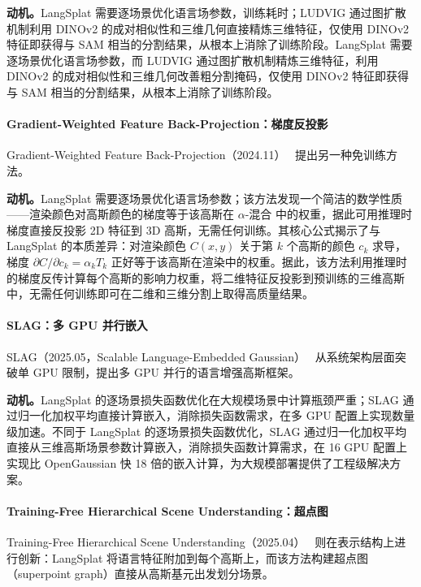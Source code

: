 \textbf{动机。}LangSplat 需要逐场景优化语言场参数，训练耗时；LUDVIG 通过图扩散机制利用 DINOv2 的成对相似性和三维几何直接精炼三维特征，仅使用 DINOv2 特征即获得与 SAM 相当的分割结果，从根本上消除了训练阶段。LangSplat 需要逐场景优化语言场参数，而 LUDVIG 通过图扩散机制精炼三维特征，利用 DINOv2 的成对相似性和三维几何改善粗分割掩码，仅使用 DINOv2 特征即获得与 SAM 相当的分割结果，从根本上消除了训练阶段。

\paragraph{Gradient-Weighted Feature Back-Projection：梯度反投影} Gradient-Weighted Feature Back-Projection（2024.11）~\cite{2411_15193} 提出另一种免训练方法。

\textbf{动机。}LangSplat 需要逐场景优化语言场参数；该方法发现一个简洁的数学性质——渲染颜色对高斯颜色的梯度等于该高斯在 $\alpha$-混合 中的权重，据此可用推理时梯度直接反投影 2D 特征到 3D 高斯，无需任何训练。其核心公式揭示了与 LangSplat 的本质差异：对渲染颜色 $C(x,y)$ 关于第 $k$ 个高斯的颜色 $c_k$ 求导，梯度 $\partial C / \partial c_k = \alpha_k T_k$ 正好等于该高斯在渲染中的权重。据此，该方法利用推理时的梯度反传计算每个高斯的影响力权重，将二维特征反投影到预训练的三维高斯中，无需任何训练即可在二维和三维分割上取得高质量结果。

\paragraph{SLAG：多 GPU 并行嵌入} SLAG（2025.05，Scalable Language-Embedded Gaussian）~\cite{2505_08124} 从系统架构层面突破单 GPU 限制，提出多 GPU 并行的语言增强高斯框架。

\textbf{动机。}LangSplat 的逐场景损失函数优化在大规模场景中计算瓶颈严重；SLAG 通过归一化加权平均直接计算嵌入，消除损失函数需求，在多 GPU 配置上实现数量级加速。不同于 LangSplat 的逐场景损失函数优化，SLAG 通过归一化加权平均直接从三维高斯场景参数计算嵌入，消除损失函数计算需求，在 16 GPU 配置上实现比 OpenGaussian 快 18 倍的嵌入计算，为大规模部署提供了工程级解决方案。

\paragraph{Training-Free Hierarchical Scene Understanding：超点图} Training-Free Hierarchical Scene Understanding（2025.04）~\cite{2504_13153} 则在表示结构上进行创新：LangSplat 将语言特征附加到每个高斯上，而该方法构建超点图（superpoint graph）直接从高斯基元出发划分场景。

